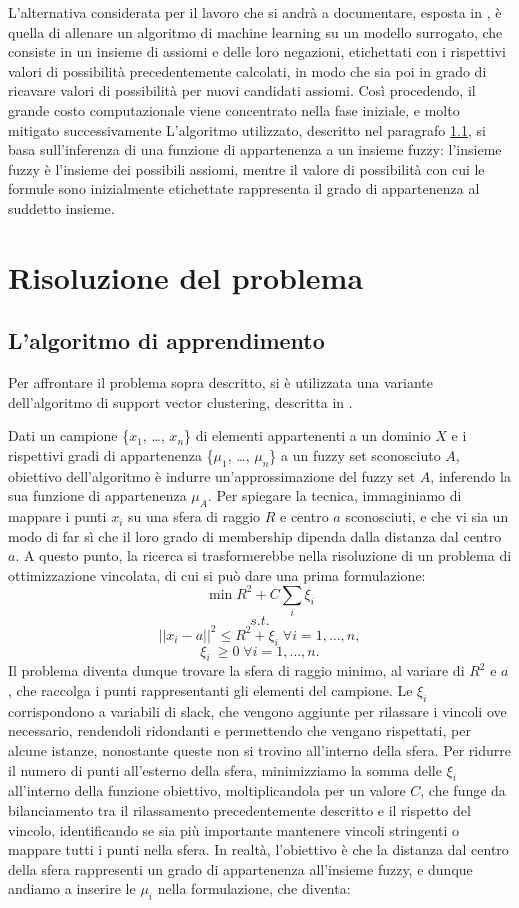 \documentclass[12pt,a4paper]{report}
\begin{document}
L'alternativa considerata per il lavoro che si andrà a documentare, esposta in \cite{sacpaper}, è quella di allenare un algoritmo di machine learning su un modello surrogato, che consiste in un insieme di assiomi e delle loro negazioni, etichettati con i rispettivi valori di possibilità precedentemente calcolati, in modo che sia poi in grado di ricavare valori di possibilità per nuovi candidati assiomi.  Così procedendo, il grande costo computazionale viene concentrato nella fase iniziale, e molto mitigato successivamente
L'algoritmo utilizzato, descritto nel paragrafo \ref{algorithmParagraph}, si basa sull'inferenza di una funzione di appartenenza a un insieme fuzzy: l'insieme fuzzy è l'insieme dei possibili assiomi, mentre il valore di possibilità con cui le formule sono inizialmente etichettate rappresenta il grado di appartenenza al suddetto insieme.

\chapter{Risoluzione del problema}
\section{L'algoritmo di apprendimento}\label{algorithmParagraph}
Per affrontare il problema sopra descritto, si è utilizzata una variante dell'algoritmo di support vector clustering, descritta in \cite{svpaper}.

Dati un campione  \{$x_1$, \dots , $x_n$\} di elementi appartenenti a un dominio $X$ e i rispettivi gradi di appartenenza  \{$\mu_1$, \dots , $\mu_n$\}  a un fuzzy set sconosciuto $A$, obiettivo dell'algoritmo è indurre un'approssimazione del fuzzy set $A$,  inferendo la sua funzione di appartenenza $\mu_A$. Per spiegare la tecnica, immaginiamo di mappare i punti  $x_i$ su una sfera di raggio $R$  e centro $a$ sconosciuti, e che vi sia un modo di far sì che il  loro  grado di membership dipenda dalla distanza dal centro $a$.
A questo punto, la ricerca si trasformerebbe nella risoluzione di un problema di ottimizzazione vincolata, di cui si può dare una prima formulazione:
\[ \min R^2 + C\sum_{i} \xi_{i}\]
\[s.t.\]
\[||x_i - a||^2  \leq R^2 + \xi_{i} \; \forall i = 1, \dots, n,\]
\[ \xi_{i}\ \geq 0 \; \forall i = 1, \dots, n.\]
Il problema diventa dunque trovare la sfera di raggio minimo, al variare di $R^2$ e $a$, che raccolga i punti rappresentanti gli elementi del campione.  
Le $\xi_i$ corrispondono a variabili di slack, che vengono aggiunte per rilassare i vincoli ove necessario, rendendoli ridondanti e permettendo che vengano rispettati, per alcune istanze, nonostante queste non si trovino all'interno della sfera. Per ridurre il numero di punti all'esterno della sfera, minimizziamo la somma delle $\xi_i$ all'interno della funzione obiettivo, moltiplicandola per un valore $C$, che funge da bilanciamento tra il rilassamento precedentemente descritto e il rispetto del vincolo, identificando se sia più importante mantenere vincoli stringenti o mappare tutti i punti nella sfera.
In realtà, l'obiettivo è che la distanza dal centro della sfera rappresenti un grado di appartenenza all'insieme fuzzy, e dunque andiamo a inserire le $\mu_i$ nella formulazione, che diventa:
\end{document}
